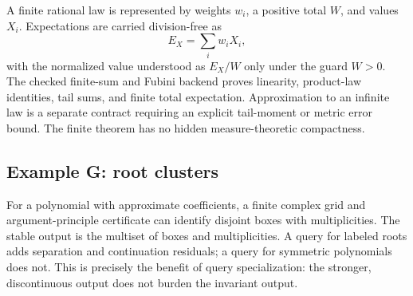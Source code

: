 A finite rational law is represented by weights \(w_i\), a positive total \(W\), and values \(X_i\).  Expectations are carried division-free as
\[
                 E_X=\sum_i w_iX_i,
\]
with the normalized value understood as \(E_X/W\) only under the guard \(W>0\).  The checked finite-sum and Fubini backend proves linearity, product-law identities, tail sums, and finite total expectation.  Approximation to an infinite law is a separate contract requiring an explicit tail-moment or metric error bound.  The finite theorem has no hidden measure-theoretic compactness.

\subsection{Example G: root clusters}

For a polynomial with approximate coefficients, a finite complex grid and argument-principle certificate can identify disjoint boxes with multiplicities.  The stable output is the multiset of boxes and multiplicities.  A query for labeled roots adds separation and continuation residuals; a query for symmetric polynomials does not.  This is precisely the benefit of query specialization: the stronger, discontinuous output does not burden the invariant output.
